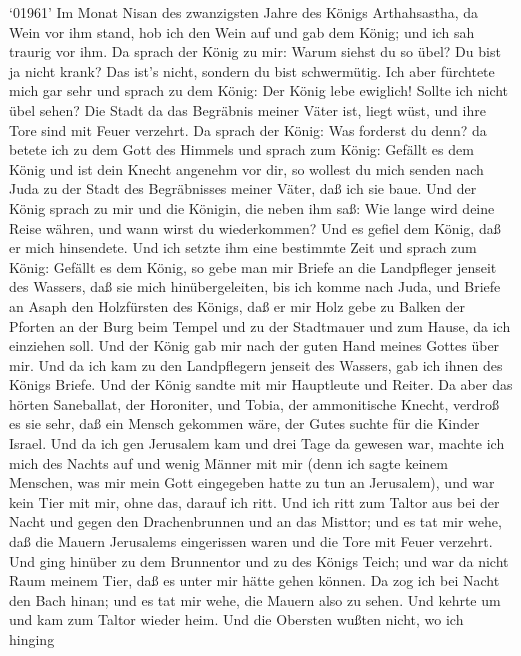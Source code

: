  `01961' Im Monat Nisan des zwanzigsten Jahre des Königs
Arthahsastha, da Wein vor ihm stand, hob ich den Wein auf und gab dem
König; und ich sah traurig vor ihm.  Da sprach der König zu
mir: Warum siehst du so übel? Du bist ja nicht krank? Das ist's nicht,
sondern du bist schwermütig. Ich aber fürchtete mich gar sehr
 und sprach zu dem König: Der König lebe ewiglich! Sollte
ich nicht übel sehen? Die Stadt da das Begräbnis meiner Väter ist, liegt
wüst, und ihre Tore sind mit Feuer verzehrt.  Da sprach der
König: Was forderst du denn? da betete ich zu dem Gott des Himmels
 und sprach zum König: Gefällt es dem König und ist dein
Knecht angenehm vor dir, so wollest du mich senden nach Juda zu der
Stadt des Begräbnisses meiner Väter, daß ich sie baue.  Und
der König sprach zu mir und die Königin, die neben ihm saß: Wie lange
wird deine Reise währen, und wann wirst du wiederkommen? Und es gefiel
dem König, daß er mich hinsendete. Und ich setzte ihm eine bestimmte
Zeit  und sprach zum König: Gefällt es dem König, so gebe
man mir Briefe an die Landpfleger jenseit des Wassers, daß sie mich
hinübergeleiten, bis ich komme nach Juda,  und Briefe an
Asaph den Holzfürsten des Königs, daß er mir Holz gebe zu Balken der
Pforten an der Burg beim Tempel und zu der Stadtmauer und zum Hause, da
ich einziehen soll. Und der König gab mir nach der guten Hand meines
Gottes über mir.  Und da ich kam zu den Landpflegern jenseit
des Wassers, gab ich ihnen des Königs Briefe. Und der König sandte mit
mir Hauptleute und Reiter.  Da aber das hörten Saneballat,
der Horoniter, und Tobia, der ammonitische Knecht, verdroß es sie sehr,
daß ein Mensch gekommen wäre, der Gutes suchte für die Kinder Israel.
 Und da ich gen Jerusalem kam und drei Tage da gewesen war,
 machte ich mich des Nachts auf und wenig Männer mit mir
(denn ich sagte keinem Menschen, was mir mein Gott eingegeben hatte zu
tun an Jerusalem), und war kein Tier mit mir, ohne das, darauf ich ritt.
 Und ich ritt zum Taltor aus bei der Nacht und gegen den
Drachenbrunnen und an das Misttor; und es tat mir wehe, daß die Mauern
Jerusalems eingerissen waren und die Tore mit Feuer verzehrt.
 Und ging hinüber zu dem Brunnentor und zu des Königs
Teich; und war da nicht Raum meinem Tier, daß es unter mir hätte gehen
können.  Da zog ich bei Nacht den Bach hinan; und es tat
mir wehe, die Mauern also zu sehen. Und kehrte um und kam zum Taltor
wieder heim.  Und die Obersten wußten nicht, wo ich hinging
